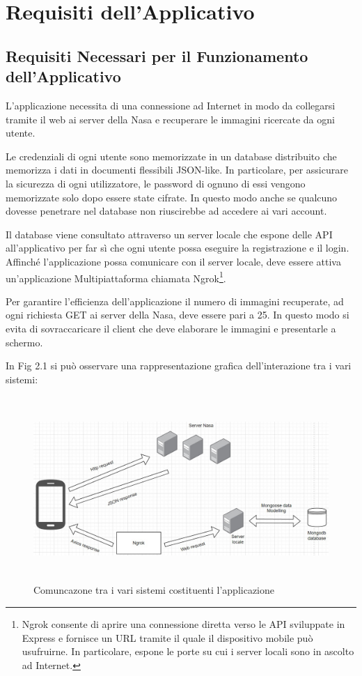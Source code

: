 \section{Requisiti dell'Applicativo}
\subsection{Requisiti Necessari per il Funzionamento dell'Applicativo}

L'applicazione necessita di una connessione ad Internet in modo da collegarsi
tramite il web ai server della Nasa e recuperare le immagini ricercate da ogni utente.

Le credenziali di ogni utente sono memorizzate in un database distribuito che memorizza i dati in documenti flessibili JSON-like. In particolare, per assicurare la sicurezza di ogni utilizzatore, le password di ognuno di essi vengono memorizzate
solo dopo essere state cifrate. In questo modo anche se qualcuno dovesse penetrare nel database non riuscirebbe ad accedere ai vari account.

Il database viene consultato attraverso un server locale che espone delle API all'applicativo per far s\`i che ogni utente possa eseguire la registrazione e il login.
Affinch\'e l'applicazione possa comunicare con il server locale, deve essere attiva un'applicazione Multipiattaforma chiamata Ngrok\footnote{Ngrok consente di aprire una connessione diretta verso le API sviluppate in Express e fornisce un URL tramite il quale il dispositivo mobile pu\`o usufruirne. In particolare, espone le porte su cui i server locali sono in ascolto ad Internet.}.


Per garantire l'efficienza dell'applicazione il numero di immagini recuperate, ad ogni richiesta GET ai server della Nasa, deve essere pari a 25. In questo modo si evita di sovraccaricare il client che deve elaborare le immagini e presentarle a schermo.

In Fig 2.1 si pu\`o osservare una rappresentazione grafica dell'interazione tra i vari sistemi:
\begin{figure}[h]
    \centering
    \includegraphics[width=13cm, height=7cm]{images/ModelloDiComunicazioneApplicazione.jpg}
    \caption[differenzeiteot]{Comuncazone tra i vari sistemi costituenti l'applicazione}
    \label{fig:modellodicomunicazione}
\end{figure}
